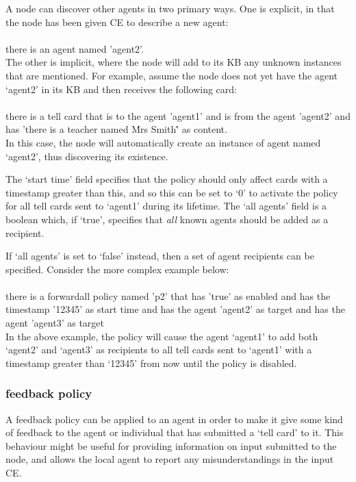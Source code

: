 \documentclass{scrartcl}
\newcommand{\ce}[1]{\textsf{#1}}
\begin{document}
A node can discover other agents in two primary ways. One is explicit, in that the node has been given CE to describe a new agent:\\
\\\ce{there is an agent named 'agent2'.}\\

The other is implicit, where the node will add to its KB any unknown instances that are mentioned. For example, assume the node does not yet have the agent `agent2' in its KB and then receives the following card:\\
\\\ce{there is a tell card that is to the agent 'agent1' and is from the agent 'agent2' and has 'there is a teacher named \'Mrs Smith\'' as content.}\\

In this case, the node will automatically create an instance of agent named `agent2', thus discovering its existence.

The `start time' field specifies that the policy should only affect cards with a timestamp greater than this, and so this can be set to `0' to activate the policy for all tell cards sent to `agent1' during its lifetime. The `all agents' field is a boolean which, if `true', specifies that \textit{all} known agents should be added as a recipient.

If `all agents' is set to `false' instead, then a set of agent recipients can be specified. Consider the more complex example below:\\
\\\ce{there is a forwardall policy named 'p2' that has 'true' as enabled and has the timestamp '12345' as start time and has the agent 'agent2' as target and has the agent 'agent3' as target}\\

In the above example, the policy will cause the agent `agent1' to add both `agent2' and `agent3' as recipients to all tell cards sent to `agent1' with a timestamp greater than `12345' from now until the policy is disabled.

\subsubsection{\ce{feedback policy}}
A \ce{feedback policy} can be applied to an agent in order to make it give some kind of feedback to the agent or individual that has submitted a `tell card' to it. This behaviour might be useful for providing information on input submitted to the node, and allows the local agent to report any misunderstandings in the input CE.
\end{document}
